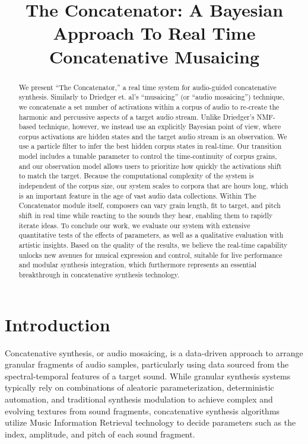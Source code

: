 \documentclass{article}
\title{The Concatenator: A Bayesian Approach To Real Time Concatenative Musaicing}
\begin{document}
%
\maketitle
%

\begin{abstract}
    We present ``The Concatenator,'' a real time system for audio-guided concatenative synthesis. Similarly to Driedger et. al's ``musaicing'' (or ``audio mosaicing'') technique, we concatenate a set number of activations within a corpus of audio to re-create the harmonic and percussive aspects of a target audio stream. Unlike Driedger's NMF-based technique, however, we instead use an explicitly Bayesian point of view, where corpus activations are hidden states and the target audio stream is an observation. We use a particle filter to infer the best hidden corpus states in real-time. Our transition model includes a tunable parameter to control the time-continuity of corpus grains, and our observation model allows users to prioritize how quickly the activations shift to match the target. Because the computational complexity of the system is independent of the corpus size, our system scales to corpora that are hours long, which is an important feature in the age of vast audio data collections. Within The Concatenator module itself, composers can vary grain length, fit to target, and pitch shift in real time while reacting to the sounds they hear, enabling them to rapidly iterate ideas. To conclude our work, we evaluate our system with extensive quantitative tests of the effects of parameters, as well as a qualitative evaluation with artistic insights. Based on the quality of the results, we believe the real-time capability unlocks new avenues for musical expression and control, suitable for live performance and modular synthesis integration, which furthermore represents an essential breakthrough in concatenative synthesis technology.
    
\end{abstract}

\section{Introduction}

Concatenative synthesis, or audio mosaicing, is a data-driven approach to arrange granular fragments of audio samples, particularly using data sourced from the spectral-temporal features of a target sound. While granular synthesis systems typically rely on combinations of aleatoric parameterization, deterministic automation, and traditional synthesis modulation to achieve complex and evolving textures from sound fragments, concatenative synthesis algorithms utilize Music Information Retrieval technology to decide parameters such as the index, amplitude, and pitch of each sound fragment. 
\end{document}
